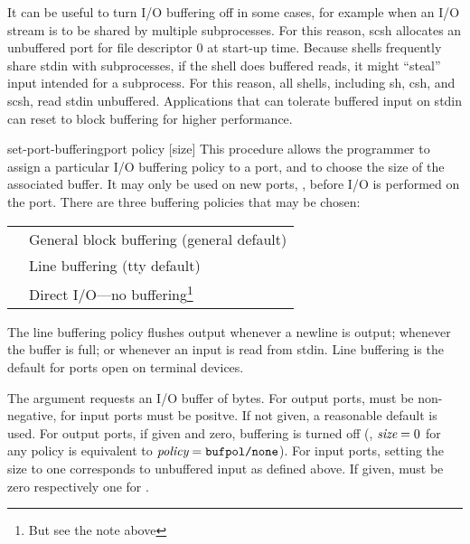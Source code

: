 It can be useful to turn I/O buffering off in some cases, for example
when an I/O stream is to be shared by multiple subprocesses.
For this reason, scsh allocates an unbuffered port for file descriptor 0
at start-up time.
Because shells frequently share stdin with subprocesses, if the shell
does buffered reads, it might ``steal'' input intended for a subprocess.  For
this reason, all shells, including sh, csh, and scsh, read stdin unbuffered.
Applications that can tolerate buffered input on stdin can reset
 to block buffering for higher performance.


\begin{defundesc}{set-port-buffering}{port policy [size]}\undefined
This procedure allows the programmer to assign a particular I/O buffering
policy to a port, and to choose the size of the associated buffer.
It may only be used on new ports, \ie, before I/O is performed on the port.
There are three buffering policies that may be chosen:
        \begin{inset}
        \begin{tabular}{l@{\qquad}l}
        \exi{bufpol/block} & General block buffering (general default) \\
        \exi{bufpol/line}  & Line buffering (tty default) \\
        \exi{bufpol/none}  & Direct I/O---no buffering\footnote{But see the note above}
        \end{tabular}
        \end{inset}
The line buffering policy flushes output whenever a newline is output;
whenever the buffer is full; or whenever an input is read from stdin.
Line buffering is the default for ports open on terminal devices.

The  argument requests an I/O buffer of  bytes.
For output ports,  must be non-negative, for input ports
 must be positve. If not given, a reasonable default is
used. For output ports, if given and zero, buffering is turned off
(\ie, $\var{size} = 0$ for any policy is equivalent to $\var{policy} =
\ex{bufpol/none}$). For input ports, setting the size to one
corresponds to unbuffered input as defined above. If given, 
must be zero respectively one for .
\end{defundesc}

